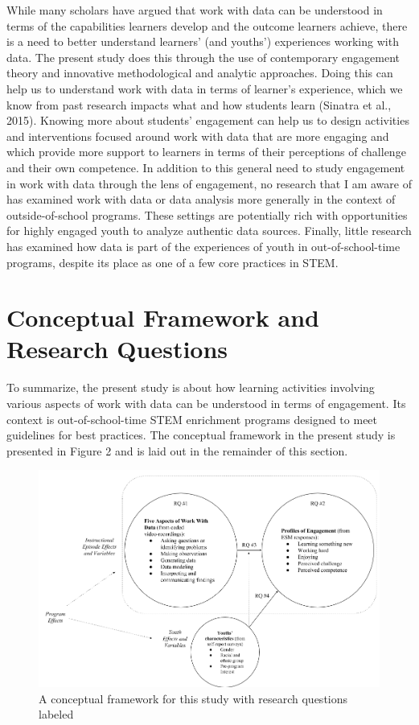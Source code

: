 \documentclass[]{msu-thesis}
\theoremstyle{definition}
\theoremstyle{definition}
\theoremstyle{definition}
\theoremstyle{remark}
\begin{document}
While many scholars have argued that work with data can be understood in
terms of the capabilities learners develop and the outcome learners
achieve, there is a need to better understand learners' (and youths')
experiences working with data. The present study does this through the
use of contemporary engagement theory and innovative methodological and
analytic approaches. Doing this can help us to understand work with data
in terms of learner's experience, which we know from past research
impacts what and how students learn (Sinatra et al., 2015). Knowing more
about students' engagement can help us to design activities and
interventions focused around work with data that are more engaging and
which provide more support to learners in terms of their perceptions of
challenge and their own competence. In addition to this general need to
study engagement in work with data through the lens of engagement, no
research that I am aware of has examined work with data or data analysis
more generally in the context of outside-of-school programs. These
settings are potentially rich with opportunities for highly engaged
youth to analyze authentic data sources. Finally, little research has
examined how data is part of the experiences of youth in
out-of-school-time programs, despite its place as one of a few core
practices in STEM.

\section{Conceptual Framework and Research
Questions}\label{conceptual-framework-and-research-questions}

To summarize, the present study is about how learning activities
involving various aspects of work with data can be understood in terms
of engagement. Its context is out-of-school-time STEM enrichment
programs designed to meet guidelines for best practices. The conceptual
framework in the present study is presented in Figure 2 and is laid out
in the remainder of this section.

\begin{figure}

{\centering \includegraphics[width=0.8\linewidth]{images/figure2} 

}

\caption{A conceptual framework for this study with research questions labeled}\label{fig:unnamed-chunk-2}
\end{figure}
\end{document}
